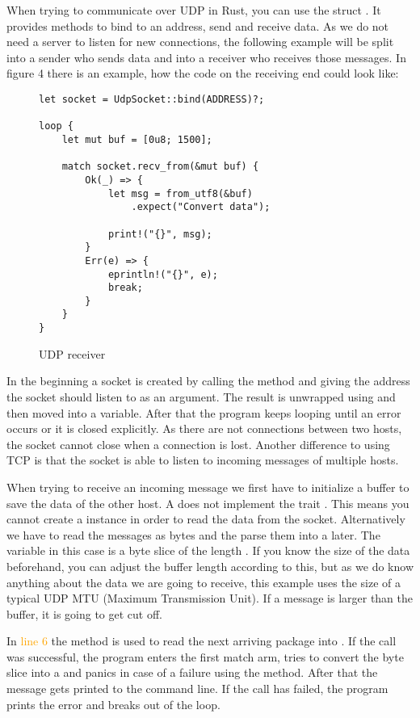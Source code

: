 When trying to communicate over UDP in Rust, you can use the struct . It provides methods to
bind to an address, send and receive data. As we do not need a server to listen for new connections, the following
example will be split into a sender who sends data and into a receiver who receives those messages. In figure 4 there
is an example, how the code on the receiving end could look like:

\begin{figure}[h]
    \begin{verbatim}
let socket = UdpSocket::bind(ADDRESS)?;

loop {
    let mut buf = [0u8; 1500];

    match socket.recv_from(&mut buf) {
        Ok(_) => {
            let msg = from_utf8(&buf)
                .expect("Convert data");

            print!("{}", msg);
        }
        Err(e) => {
            eprintln!("{}", e);
            break;
        }
    }
}
    \end{verbatim}
    \caption{UDP receiver}
\end{figure}

In the beginning a socket is created by calling the  method and giving the address the socket should listen
to as an argument. The result is unwrapped using  and then moved into a variable. After that the program keeps
looping until an error occurs or it is closed explicitly. As there are not connections between two hosts, the socket
cannot close when a connection is lost. Another difference to using TCP is that the socket is able to listen to
incoming messages of multiple hosts.

When trying to receive an incoming message we first have to initialize a buffer to save the data of the other host.
A  does not implement the trait . This means you cannot create a 
instance in order to read the data from the socket. Alternatively we have to read the messages as bytes and the parse
them into a  later. The variable  in this case is a byte slice of the length . If you
know the size of the data beforehand, you can adjust the buffer length according to this, but as we do know anything
about the data we are going to receive, this example uses the size of a typical UDP MTU (Maximum Transmission Unit). If
a message is larger than the buffer, it is going to get cut off.

In \textcolor{orange}{line 6} the method  is used to read the next arriving package into . If
the call was successful, the program enters the first match arm, tries to convert the byte slice into a  and
panics in case of a failure using the  method. After that the message gets printed to the command line. If
the call has failed, the program prints the error and breaks out of the loop.

